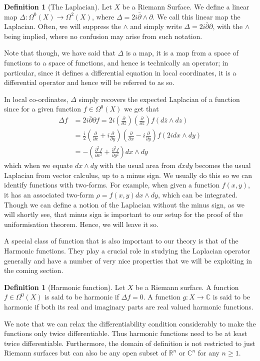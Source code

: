\documentclass[a4paper,12pt]{report}
\theoremstyle{plain}
\theoremstyle{definition}
\newtheorem{defn}[thm]{Definition}
\begin{document}
\begin{defn}[The Laplacian]\label{LaplacianDef}
  Let $X$ be a Riemann Surface. We define a linear map $\Delta:\Omega^0(X)\rightarrow \Omega^2(X)$, where $\Delta=2i\bar{\partial}\wedge\partial$. We call this linear map the Laplacian. Often, we will suppress the $\wedge$ and simply write $\Delta=2i\bar{\partial}\partial$, with the $\wedge$ being implied, where no confusion may arise from such notation.
\end{defn}

Note that though, we have said that $\Delta$ is a map, it is a map from a space of functions to a space of functions, and hence is technically an operator; in particular, since it defines a differential equation in local coordinates, it is a differential operator and hence will be referred to as so.

In local co-ordinates, $\Delta$ simply recovers the expected Laplacian of a function since for a given function $f\in \Omega^0(X)$ we get that 
\begin{align*}
  \Delta f &= 2i\bar{\partial }\partial f = 2i(\frac{\partial}{\partial\bar{z}})(\frac{\partial}{\partial z})f(d\bar{z}\wedge dz) \\
  &=\frac{i}{2}(\frac{\partial}{\partial x} + i\frac{\partial}{\partial y})(\frac{\partial}{\partial x} - i\frac{\partial}{\partial y})f(2idx\wedge dy) \\
  &= -(\frac{\partial^2 f}{\partial x^2} + \frac{\partial^2 f}{\partial y^2})dx\wedge dy 
\end{align*}
which when we equate $dx\wedge dy$ with the usual area from $dxdy$ becomes the usual Laplacian from vector calculus, up to a minus sign. We usually do this so we can identify functions with two-forms. For example, when given a function $f(x,y)$, it has an associated two-form $\rho = f(x,y) dx\wedge dy$, which can be integrated. Though we can define a notion of the Laplacian without the minus sign, as we will shortly see, that minus sign is important to our setup for the proof of the uniformisation theorem. Hence, we will leave it so. 

A special class of function that is also important to our theory is that of the 
Harmonic functions. They play a crucial role in studying the Laplacian operator generally and have a number of very nice properties that we will be exploiting in the coming section.
\begin{defn}[Harmonic function]\label{HarmonicDef}
  Let $X$ be a Riemann surface. A function $f\in \Omega^0(X)$ is said to be harmonic if $\Delta f = 0$. A  function $g:X \rightarrow \mathbb{C}$ is said to be harmonic if both its real and imaginary parts are real valued harmonic functions.
\end{defn}
We note that we can relax the differentiability condition considerably to make the functions only twice differentiable. Thus harmonic functions need to be at least twice differentiable. Furthermore, the domain of definition is not restricted to just Riemann surfaces but can also be any open subset of $\mathbb{R}^n$ or $\mathbb{C}^n$ for any $n\geq 1$. 
\end{document}
